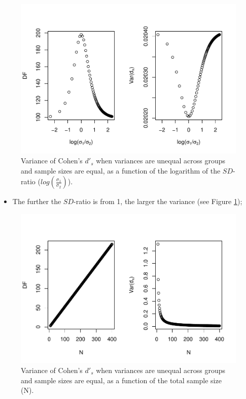 \documentclass[
  man]{apa6}
\providecommand{\tightlist}{%
  \setlength{\itemsep}{0pt}\setlength{\parskip}{0pt}}
\begin{document}
\begin{figure}
\centering
\includegraphics{Theoretical-Variance-of-all-estimators-as-a-function-of-population-parameters_files/figure-latex/varcohendprimehetbalSDratio2-1.pdf}
\caption{\label{fig:varcohendprimehetbalSDratio2}Variance of Cohen's \(d'_s\) when variances are unequal across groups and sample sizes are equal, as a function of the logarithm of the \(SD\)-ratio (\(log \left( \frac{\sigma_1}{\sigma_2} \right)\)).}
\end{figure}

\begin{itemize}
\tightlist
\item
  The further the \(SD\)-ratio is from 1, the larger the variance (see Figure \ref{fig:varcohendprimehetbalSDratio2});
\end{itemize}

\begin{figure}
\centering
\includegraphics{Theoretical-Variance-of-all-estimators-as-a-function-of-population-parameters_files/figure-latex/varcohendprimehetbalNsize2-1.pdf}
\caption{\label{fig:varcohendprimehetbalNsize2}Variance of Cohen's \(d'_s\) when variances are unequal across groups and sample sizes are equal, as a function of the total sample size (N).}
\end{figure}
\end{document}
